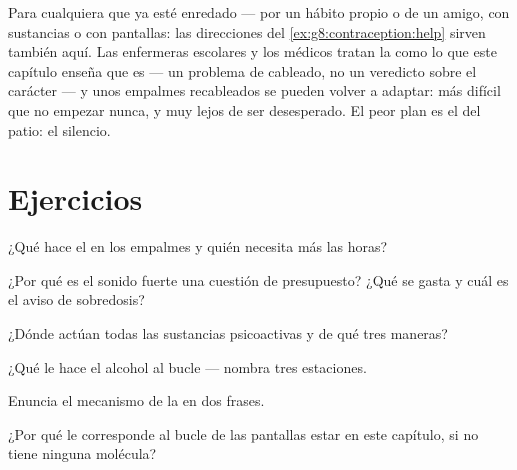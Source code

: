 \begin{example}\label{ex:g8:protecting-the-nervous-system:help}
Para cualquiera que ya esté enredado --- por un hábito propio o de un
amigo, con sustancias o con pantallas: las direcciones del
\cref{ex:g8:contraception:help} sirven también aquí. Las enfermeras
escolares y los médicos tratan la  como lo que este capítulo
enseña que es --- un problema de cableado, no un veredicto sobre el
carácter --- y unos empalmes recableados se pueden volver a adaptar:
más difícil que no empezar nunca, y muy lejos de ser desesperado. El
peor plan es el del patio: el silencio.
\end{example}

\section{Ejercicios}

\begin{exercise}[$\star$]\label{exo:g8:protecting-the-nervous-system:1}
¿Qué hace el  en los empalmes y quién necesita más las horas?
\end{exercise}

\begin{exercise}[$\star$]\label{exo:g8:protecting-the-nervous-system:2}
¿Por qué es el sonido fuerte una cuestión de presupuesto? ¿Qué se gasta
y cuál es el aviso de sobredosis?
\end{exercise}

\begin{exercise}[$\star$]\label{exo:g8:protecting-the-nervous-system:3}
¿Dónde actúan todas las sustancias psicoactivas y de qué tres maneras?
\end{exercise}

\begin{exercise}[$\star$]\label{exo:g8:protecting-the-nervous-system:4}
¿Qué le hace el alcohol al bucle --- nombra tres estaciones.
\end{exercise}

\begin{exercise}[$\star$]\label{exo:g8:protecting-the-nervous-system:5}
Enuncia el mecanismo de la  en dos frases.
\end{exercise}

\begin{exercise}[$\star$]\label{exo:g8:protecting-the-nervous-system:6}
¿Por qué le corresponde al bucle de las pantallas estar en este
capítulo, si no tiene ninguna molécula?
\end{exercise}


